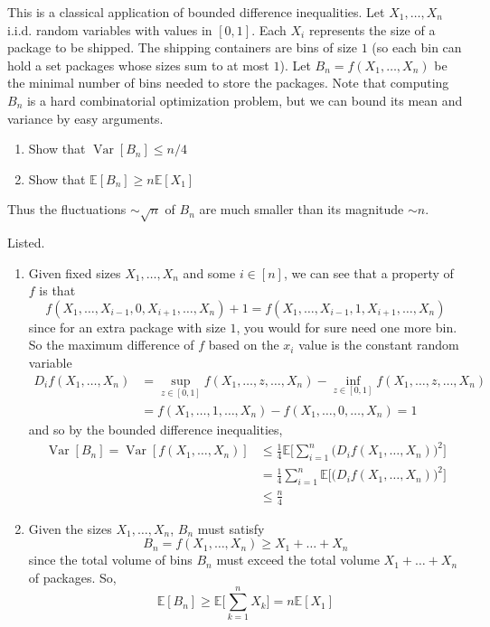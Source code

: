 \documentclass{article}
\DeclareMathOperator{\Var}{Var}
\begin{document}
  \begin{exercise}
  This is a classical application of bounded difference inequalities. Let $X_1, \ldots, X_n$ i.i.d. random variables with values in $[0, 1]$. Each $X_i$ represents the size of a package to be shipped. The shipping containers are bins of size $1$ (so each bin can hold a set packages whose sizes sum to at most $1$). Let $B_n = f(X_1, \ldots, X_n)$ be the minimal number of bins needed to store the packages. Note that computing $B_n$ is a hard combinatorial optimization problem, but we can bound its mean and variance by easy arguments. 
  \begin{enumerate}
      \item Show that $\Var[B_n] \leq n/4$
      \item Show that $\mathbb{E}[B_n] \geq n \mathbb{E}[X_1]$
  \end{enumerate}
  Thus the fluctuations $\sim \sqrt{n}$ of $B_n$ are much smaller than its magnitude $\sim n$. 
  \end{exercise}
  \begin{solution}
  Listed. 
  \begin{enumerate}
      \item Given fixed sizes $X_1, \ldots, X_n$ and some $i \in [n]$, we can see that a property of $f$ is that 
      \[f(X_1, \ldots, X_{i-1}, 0, X_{i+1}, \ldots, X_n) + 1 = f(X_1, \ldots, X_{i-1}, 1, X_{i+1}, \ldots, X_n)\]
      since for an extra package with size $1$, you would for sure need one more bin. So the maximum difference of $f$ based on the $x_i$ value is the constant random variable 
      \begin{align*}
          D_i f(X_1, \ldots, X_n) & = \sup_{z \in [0, 1]} f(X_1, \ldots, z, \ldots, X_n) - \inf_{z \in [0, 1]} f(X_1, \ldots, z, \ldots, X_n)\\
          & = f(X_1, \ldots, 1, \ldots, X_n) - f(X_1, \ldots, 0, \ldots, X_n) = 1
      \end{align*}
      and so by the bounded difference inequalities, 
      \begin{align*}
          \Var[B_n] = \Var[f(X_1, \ldots, X_n)] & \leq \frac{1}{4} \mathbb{E} \bigg[ \sum_{i=1}^n \big( D_i f(X_1, \ldots, X_n) \big)^2 \bigg] \\
          & = \frac{1}{4} \sum_{i=1}^n \mathbb{E} \big[ \big( D_i f(X_1, \ldots, X_n) \big)^2 \big] \\
          & \leq \frac{n}{4} 
      \end{align*}
      \item Given the sizes $X_1, \ldots, X_n$, $B_n$ must satisfy 
      \[B_n = f(X_1, \ldots, X_n) \geq X_1 + \ldots + X_n\] 
      since the total volume of bins $B_n$ must exceed the total volume $X_1 + \ldots + X_n$ of packages. So, 
      \[\mathbb{E}[B_n] \geq \mathbb{E}\bigg[ \sum_{k=1}^n X_k \bigg] = n \mathbb{E}[X_1]\]
  \end{enumerate}
  \end{solution}
\end{document}
